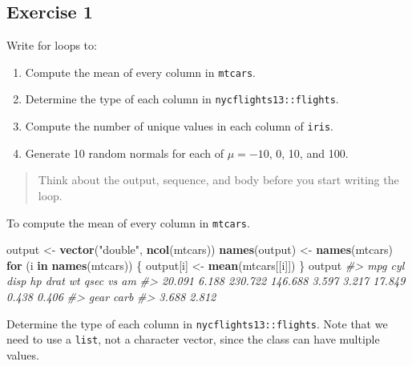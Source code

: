\documentclass[]{book}
\newenvironment{Shaded}{\begin{snugshade}}{\end{snugshade}}
\newcommand{\CommentTok}[1]{\textcolor[rgb]{0.56,0.35,0.01}{\textit{#1}}}
\newcommand{\ControlFlowTok}[1]{\textcolor[rgb]{0.13,0.29,0.53}{\textbf{#1}}}
\newcommand{\KeywordTok}[1]{\textcolor[rgb]{0.13,0.29,0.53}{\textbf{#1}}}
\newcommand{\NormalTok}[1]{#1}
\newcommand{\StringTok}[1]{\textcolor[rgb]{0.31,0.60,0.02}{#1}}
\providecommand{\tightlist}{%
  \setlength{\itemsep}{0pt}\setlength{\parskip}{0pt}}
\theoremstyle{definition}
\theoremstyle{definition}
\theoremstyle{definition}
\theoremstyle{remark}
\begin{document}
\hypertarget{exercise-1-52}{%
\subsection{Exercise 1}\label{exercise-1-52}}

Write for loops to:

\begin{enumerate}
\def\labelenumi{\arabic{enumi}.}
\tightlist
\item
  Compute the mean of every column in \texttt{mtcars}.
\item
  Determine the type of each column in \texttt{nycflights13::flights}.
\item
  Compute the number of unique values in each column of \texttt{iris}.
\item
  Generate 10 random normals for each of \(\mu = -10\), 0, 10, and 100.
\end{enumerate}

\begin{quote}
Think about the output, sequence, and body before you start writing the
loop.
\end{quote}

To compute the mean of every column in \texttt{mtcars}.

\begin{Shaded}
\begin{Highlighting}[]
\NormalTok{output <-}\StringTok{ }\KeywordTok{vector}\NormalTok{(}\StringTok{"double"}\NormalTok{, }\KeywordTok{ncol}\NormalTok{(mtcars))}
\KeywordTok{names}\NormalTok{(output) <-}\StringTok{ }\KeywordTok{names}\NormalTok{(mtcars)}
\ControlFlowTok{for}\NormalTok{ (i }\ControlFlowTok{in} \KeywordTok{names}\NormalTok{(mtcars)) \{}
\NormalTok{  output[i] <-}\StringTok{ }\KeywordTok{mean}\NormalTok{(mtcars[[i]])}
\NormalTok{\}}
\NormalTok{output}
\CommentTok{#>     mpg     cyl    disp      hp    drat      wt    qsec      vs      am }
\CommentTok{#>  20.091   6.188 230.722 146.688   3.597   3.217  17.849   0.438   0.406 }
\CommentTok{#>    gear    carb }
\CommentTok{#>   3.688   2.812}
\end{Highlighting}
\end{Shaded}

Determine the type of each column in \texttt{nycflights13::flights}.
Note that we need to use a \texttt{list}, not a character vector, since
the class can have multiple values.
\end{document}
